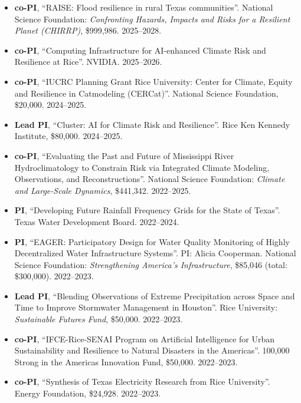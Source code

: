 \documentclass[10pt,oneside]{article}
\begin{document}
\begin{itemize}[label={}]

  \item \textbf{co-PI}, \enquote{RAISE: Flood resilience in rural Texas communities}.  National Science Foundation: \textit{Confronting Hazards, Impacts and Risks for a Resilient Planet (CHIRRP)}, \$999,986. 2025--2028.

  \item \textbf{co-PI}, \enquote{Computing Infrastructure for AI-enhanced Climate Risk and Resilience at Rice}.  NVIDIA. 2025--2026.

  \item \textbf{co-PI}, \enquote{IUCRC Planning Grant Rice University: Center for Climate, Equity and Resilience in Catmodeling (CERCat)}.  National Science Foundation, \$20,000. 2024--2025.

  \item \textbf{Lead PI}, \enquote{Cluster: AI for Climate Risk and Resilience}.  Rice Ken Kennedy Institute, \$80,000. 2024--2025.

  \item \textbf{co-PI}, \enquote{Evaluating the Past and Future of Mississippi River Hydroclimatology to Constrain Risk via Integrated Climate Modeling, Observations, and Reconstructions}.  National Science Foundation: \textit{Climate and Large-Scale Dynamics}, \$441,342. 2022--2025.

  \item \textbf{PI}, \enquote{Developing Future Rainfall Frequency Grids for the State of Texas}.  Texas Water Development Board. 2022--2024.

  \item \textbf{PI}, \enquote{EAGER: Participatory Design for Water Quality Monitoring of Highly Decentralized Water Infrastructure Systems}.  PI: Alicia Cooperman. National Science Foundation: \textit{Strengthening America's Infrastructure}, \$85,046 (total: \$300,000). 2022--2023.

  \item \textbf{Lead PI}, \enquote{Blending Observations of Extreme Precipitation across Space and Time to Improve Stormwater Management in Houston}.  Rice University: \textit{Sustainable Futures Fund}, \$50,000. 2022--2023.

  \item \textbf{co-PI}, \enquote{IFCE-Rice-SENAI Program on Artificial Intelligence for Urban Sustainability and Resilience to Natural Disasters in the Americas}.  100,000 Strong in the Americas Innovation Fund, \$50,000. 2022--2023.

  \item \textbf{co-PI}, \enquote{Synthesis of Texas Electricity Research from Rice University}.  Energy Foundation, \$24,928. 2022--2023.

\end{itemize}
\end{document}
